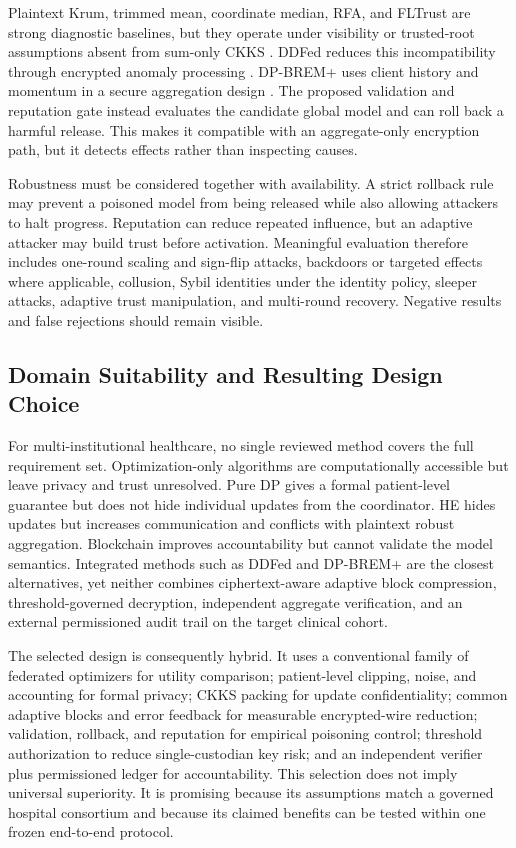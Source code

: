 Plaintext Krum, trimmed mean, coordinate median, RFA, and FLTrust are strong diagnostic baselines, but they operate under visibility or trusted-root assumptions absent from sum-only CKKS \cite{blanchard2017krum,yin2018byzantine,pillutla2022robust,cao2021fltrust}. DDFed reduces this incompatibility through encrypted anomaly processing \cite{xu2024ddfed}. DP-BREM+ uses client history and momentum in a secure aggregation design \cite{gu2025dpbrem}. The proposed validation and reputation gate instead evaluates the candidate global model and can roll back a harmful release. This makes it compatible with an aggregate-only encryption path, but it detects effects rather than inspecting causes.

Robustness must be considered together with availability. A strict rollback rule may prevent a poisoned model from being released while also allowing attackers to halt progress. Reputation can reduce repeated influence, but an adaptive attacker may build trust before activation. Meaningful evaluation therefore includes one-round scaling and sign-flip attacks, backdoors or targeted effects where applicable, collusion, Sybil identities under the identity policy, sleeper attacks, adaptive trust manipulation, and multi-round recovery. Negative results and false rejections should remain visible.

\subsection{Domain Suitability and Resulting Design Choice}

For multi-institutional healthcare, no single reviewed method covers the full requirement set. Optimization-only algorithms are computationally accessible but leave privacy and trust unresolved. Pure DP gives a formal patient-level guarantee but does not hide individual updates from the coordinator. HE hides updates but increases communication and conflicts with plaintext robust aggregation. Blockchain improves accountability but cannot validate the model semantics. Integrated methods such as DDFed and DP-BREM+ are the closest alternatives, yet neither combines ciphertext-aware adaptive block compression, threshold-governed decryption, independent aggregate verification, and an external permissioned audit trail on the target clinical cohort.

The selected design is consequently hybrid. It uses a conventional family of federated optimizers for utility comparison; patient-level clipping, noise, and accounting for formal privacy; CKKS packing for update confidentiality; common adaptive blocks and error feedback for measurable encrypted-wire reduction; validation, rollback, and reputation for empirical poisoning control; threshold authorization to reduce single-custodian key risk; and an independent verifier plus permissioned ledger for accountability. This selection does not imply universal superiority. It is promising because its assumptions match a governed hospital consortium and because its claimed benefits can be tested within one frozen end-to-end protocol.

